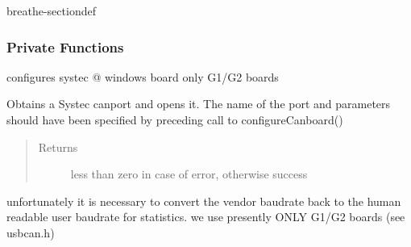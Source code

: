 \documentclass[a4paper,10pt,english]{sphinxmanual}
\begin{document}
\begin{fulllineitems}
%
\pysigstartmultiline
{}%
\pysigstopmultiline
\begin{sphinxuseclass}{breathe-sectiondef}\subsubsection*{Private Functions}


\begin{fulllineitems}
%
\pysigstartmultiline
{}%
\pysigstopmultiline
\sphinxAtStartPar
configures systec @ windows board only G1/G2 boards 

\end{fulllineitems}



\begin{fulllineitems}
%
\pysigstartmultiline
{}%
\pysigstopmultiline
\sphinxAtStartPar
Obtains a Systec canport and opens it. The name of the port and parameters should have been specified by preceding call to configureCanboard()
\begin{quote}\begin{description}
\item[{Returns}] \leavevmode
\sphinxAtStartPar
less than zero in case of error, otherwise success 

\end{description}\end{quote}

\end{fulllineitems}



\begin{fulllineitems}
%
\pysigstartmultiline
{}%
\pysigstopmultiline
\sphinxAtStartPar
unfortunately it is necessary to convert the vendor baudrate back to the human readable user baudrate for statistics. we use presently ONLY G1/G2 boards (see usbcan.h) 


\end{fulllineitems}
\end{sphinxuseclass}
\end{fulllineitems}
\end{document}
